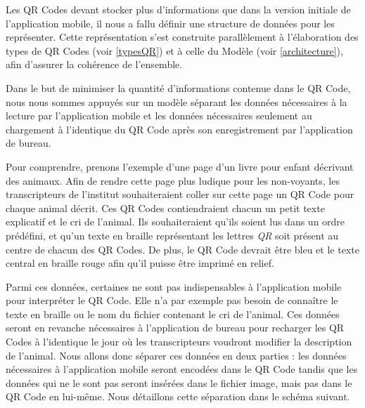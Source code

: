 \par
Les QR Codes devant stocker plus d'informations que dans la version initiale de l'application mobile, il nous a fallu définir une structure de données pour les représenter. Cette représentation s'est construite parallèlement à l'élaboration des types de QR Codes (voir \ref{typesQR}) et à celle du Modèle (voir \ref{architecture}), afin d'assurer la cohérence de l'ensemble.\\

\par
Dans le but de minimiser la quantité d'informations contenue dans le QR Code, nous nous sommes appuyés sur un modèle séparant les données nécessaires à la lecture par l'application mobile et les données nécessaires seulement au chargement à l'identique du QR Code après son enregistrement par l'application de bureau.\\

\par
Pour comprendre, prenons l'exemple d'une page d'un livre pour enfant décrivant des animaux. Afin de rendre cette page plus ludique pour les non-voyants, les transcripteurs de l'institut souhaiteraient coller sur cette page un QR Code pour chaque animal décrit. Ces QR Codes contiendraient chacun un petit texte explicatif et le cri de l'animal. Ils souhaiteraient qu'ils soient lus dans un ordre prédéfini, et qu'un texte en braille représentant les lettres \textit{QR} soit présent au centre de chacun des QR Codes. De plus, le QR Code devrait être bleu et le texte central en braille rouge afin qu'il puisse être imprimé en relief.

\par
Parmi ces données, certaines ne sont pas indispensables à l'application mobile pour interpréter le QR Code. Elle n'a par exemple pas besoin de connaître le texte en braille ou le nom du fichier contenant le cri de l'animal. Ces données seront en revanche nécessaires à l'application de bureau pour recharger les QR Codes à l'identique le jour où les transcripteurs voudront modifier la description de l'animal. Nous allons donc séparer ces données en deux parties : les données nécessaires à l'application mobile seront encodées dans le QR Code tandis que les données qui ne le sont pas seront insérées dans le fichier image, mais pas dans le QR Code en lui-même. Nous détaillons cette séparation dans le schéma suivant.



